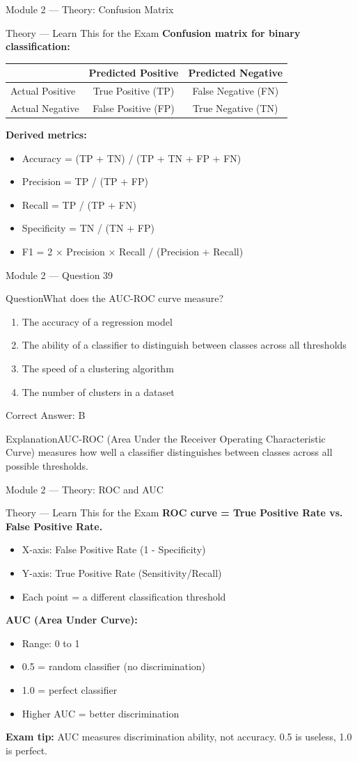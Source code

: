 \documentclass[aspectratio=169,10pt]{beamer}
\newcommand{\question}[1]{\begin{block}{Question}#1\end{block}}
\newcommand{\options}[4]{%
	\begin{enumerate}[label=\Alph*.,leftmargin=*]
		\item #1
		\item #2
		\item #3
		\item #4
	\end{enumerate}
}
\newcommand{\answerbox}[1]{\begin{exampleblock}{Correct Answer: #1}\end{exampleblock}}
\newcommand{\explain}[1]{\begin{block}{Explanation}#1\end{block}}
\newcommand{\theory}[1]{%
	\begin{block}{Theory --- Learn This for the Exam}
		\small #1
	\end{block}
}
\begin{document}
	\begin{frame}{Module 2 --- Theory: Confusion Matrix}
		\theory{
			\textbf{Confusion matrix for binary classification:}
			\begin{center}
				\small
				\begin{tabular}{@{}lcc@{}}
					\toprule
					& Predicted Positive & Predicted Negative \\
					\midrule
					Actual Positive & True Positive (TP) & False Negative (FN) \\
					Actual Negative & False Positive (FP) & True Negative (TN) \\
					\bottomrule
				\end{tabular}
			\end{center}
			\textbf{Derived metrics:}
			\begin{itemize}
				\item Accuracy = (TP + TN) / (TP + TN + FP + FN)
				\item Precision = TP / (TP + FP)
				\item Recall = TP / (TP + FN)
				\item Specificity = TN / (TN + FP)
				\item F1 = 2 × Precision × Recall / (Precision + Recall)
			\end{itemize}
		}
	\end{frame}
	
	\begin{frame}{Module 2 --- Question 39}
		\question{What does the AUC-ROC curve measure?}
		\options{The accuracy of a regression model}{The ability of a classifier to distinguish between classes across all thresholds}{The speed of a clustering algorithm}{The number of clusters in a dataset}
		\answerbox{B}
		\explain{AUC-ROC (Area Under the Receiver Operating Characteristic Curve) measures how well a classifier distinguishes between classes across all possible thresholds.}
	\end{frame}
	
	\begin{frame}{Module 2 --- Theory: ROC and AUC}
		\theory{
			\textbf{ROC curve = True Positive Rate vs. False Positive Rate.}
			\begin{itemize}
				\item X-axis: False Positive Rate (1 - Specificity)
				\item Y-axis: True Positive Rate (Sensitivity/Recall)
				\item Each point = a different classification threshold
			\end{itemize}
			\textbf{AUC (Area Under Curve):}
			\begin{itemize}
				\item Range: 0 to 1
				\item 0.5 = random classifier (no discrimination)
				\item 1.0 = perfect classifier
				\item Higher AUC = better discrimination
			\end{itemize}
			\textbf{Exam tip:} AUC measures discrimination ability, not accuracy. 0.5 is useless, 1.0 is perfect.
		}
	\end{frame}
	
\end{document}
